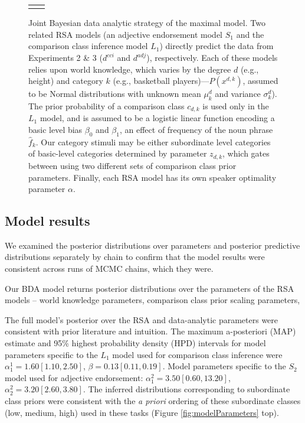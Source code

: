 \documentclass[doc]{apa6}
\begin{document}
\begin{figure}[ht!]
\begin{center}
\begin{tabular}{cc}
\begin{tikzpicture}
\end{tikzpicture}

    \end{tabular}
  \end{center}
  \caption{\small Joint Bayesian data analytic strategy of the maximal model. Two related RSA models (an adjective endorsement model $S_1$ and the comparison class inference model $L_1$) directly predict the data from Experiments 2 \& 3 ($d^{cci}$ and $d^{adj}$), respectively. Each of these models relies upon world knowledge, which varies by the degree $d$ (e.g., height) and category $k$ (e.g., basketball players)---$P(x^{d,k})$, assumed to be Normal distributions with unknown mean $\mu^d_k$ and variance $\sigma^d_k$). The prior probability of a comparison class $c_{d,k}$ is used only in the $L_1$ model, and is assumed to be a  logistic linear function encoding a basic level bias $\beta_0$ and $\beta_1$, an effect of frequency of the noun phrase $\hat{f}_k$. Our category stimuli may be either subordinate level categories of basic-level categories determined by parameter $z_{d,k}$, which gates between using two different sets of comparison class prior parameters. Finally, each RSA model has its own speaker optimality parameter $\alpha$.}
  \label{fig:bayesnet}
\end{figure}

\subsection{Model results}

We examined the posterior distributions over parameters and posterior predictive distributions separately by chain to confirm that the model results were consistent across runs of MCMC chains, which they were. 

Our BDA model returns posterior distributions over the parameters of the RSA models -- world knowledge parameters, comparison class prior scaling parameters, 

The full model's posterior over the RSA and data-analytic parameters were consistent with prior literature and intuition. The maximum a-posteriori (MAP) estimate and 95\% highest probability density (HPD) intervals for model parameters specific to the \(L_1\) model used for comparison class inference were \(\alpha^{1}_{1} = 1.60 [1.10, 2.50]\), \(\beta = 0.13 [0.11, 0.19]\). Model parameters specific to the \(S_2\) model used for adjective endorsement: \(\alpha^{2}_{1} = 3.50 [0.60, 13.20]\), \(\alpha^{2}_{2} = 3.20 [2.60, 3.80]\). The inferred distributions corresponding to subordinate class priors were consistent with the \emph{a priori} ordering of these subordinate classes (low, medium, high) used in these tasks (Figure \ref{fig:modelParameters} top).
\end{document}
